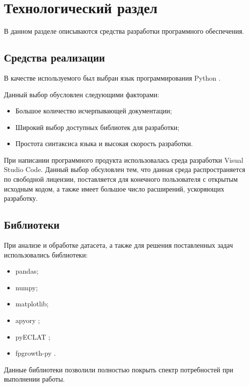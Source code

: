 \section{Технологический раздел}

В данном разделе описываются средства разработки программного обеспечения.

\subsection{Средства реализации}

В качестве используемого был выбран язык программирования Python \cite{Python}.

Данный выбор обусловлен следующими факторами:
\begin{itemize}
	\item Большое количество исчерпывающей документации;
	\item Широкий выбор доступных библиотек для разработки;
	\item Простота синтаксиса языка и высокая скорость разработки.
\end{itemize} 

При написании программного продукта использовалась среда разработки Visual Studio Code. Данный выбор обсуловлен тем, что данная среда распространяется по свободной лицензии, поставляется для конечного пользователя с открытым исходным кодом, а также имеет большое число расширений, ускоряющих разработку.

\subsection{Библиотеки}

При анализе и обработке датасета, а также для решения поставленных задач использовались библиотеки:
\begin{itemize}
	\item pandas;
	\item numpy;
	\item matplotlib;
	\item apyory \cite{apyori};
	\item pyECLAT \cite{pyECLAT};
	\item fpgrowth-py \cite{fpgrowth_py}.
\end{itemize}

Данные библиотеки позволили полностью покрыть спектр потребностей при выполнении работы.